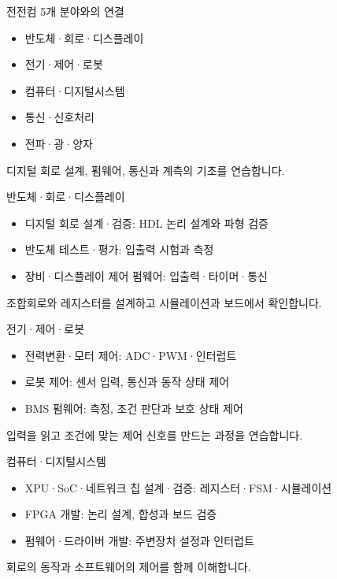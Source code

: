 \documentclass[aspectratio=169,11pt,t]{beamer}
\begin{document}
\begin{frame}{전전컴 5개 분야와의 연결}
\begin{itemize}
\item 반도체·회로·디스플레이
\item 전기·제어·로봇
\item 컴퓨터·디지털시스템
\item 통신·신호처리
\item 전파·광·양자
\end{itemize}
\vspace{0.35cm}
디지털 회로 설계, 펌웨어, 통신과 계측의 기초를 연습합니다.
\end{frame}

\begin{frame}{반도체·회로·디스플레이}
\begin{itemize}
\item 디지털 회로 설계·검증: HDL 논리 설계와 파형 검증
\item 반도체 테스트·평가: 입출력 시험과 측정
\item 장비·디스플레이 제어 펌웨어: 입출력·타이머·통신
\end{itemize}
\vspace{0.35cm}
조합회로와 레지스터를 설계하고 시뮬레이션과 보드에서 확인합니다.
\end{frame}

\begin{frame}{전기·제어·로봇}
\begin{itemize}
\item 전력변환·모터 제어: ADC·PWM·인터럽트
\item 로봇 제어: 센서 입력, 통신과 동작 상태 제어
\item BMS 펌웨어: 측정, 조건 판단과 보호 상태 제어
\end{itemize}
\vspace{0.35cm}
입력을 읽고 조건에 맞는 제어 신호를 만드는 과정을 연습합니다.
\end{frame}

\begin{frame}{컴퓨터·디지털시스템}
\begin{itemize}
\item XPU·SoC·네트워크 칩 설계·검증: 레지스터·FSM·시뮬레이션
\item FPGA 개발: 논리 설계, 합성과 보드 검증
\item 펌웨어·드라이버 개발: 주변장치 설정과 인터럽트
\end{itemize}
\vspace{0.35cm}
회로의 동작과 소프트웨어의 제어를 함께 이해합니다.
\end{frame}
\end{document}

